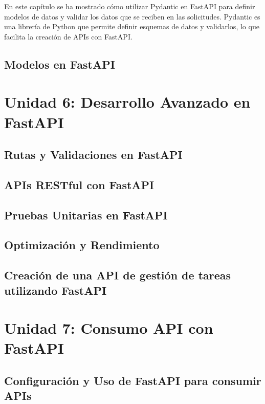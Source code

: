 \documentclass[
  a4paper,
  DIV=11,
  numbers=noendperiod,
  onepage,
  openany]{scrreprt}
\begin{document}
En este capítulo se ha mostrado cómo utilizar Pydantic en FastAPI para
definir modelos de datos y validar los datos que se reciben en las
solicitudes. Pydantic es una librería de Python que permite definir
esquemas de datos y validarlos, lo que facilita la creación de APIs con
FastAPI.

\chapter{Modelos en FastAPI}\label{modelos-en-fastapi}

\part{Unidad 6: Desarrollo Avanzado en FastAPI}

\chapter{Rutas y Validaciones en
FastAPI}\label{rutas-y-validaciones-en-fastapi}

\chapter{APIs RESTful con FastAPI}\label{apis-restful-con-fastapi}

\chapter{Pruebas Unitarias en
FastAPI}\label{pruebas-unitarias-en-fastapi}

\chapter{Optimización y
Rendimiento}\label{optimizaciuxf3n-y-rendimiento}

\chapter{Creación de una API de gestión de tareas utilizando
FastAPI}\label{creaciuxf3n-de-una-api-de-gestiuxf3n-de-tareas-utilizando-fastapi}

\part{Unidad 7: Consumo API con FastAPI}

\chapter{Configuración y Uso de FastAPI para consumir
APIs}\label{configuraciuxf3n-y-uso-de-fastapi-para-consumir-apis}
\end{document}
